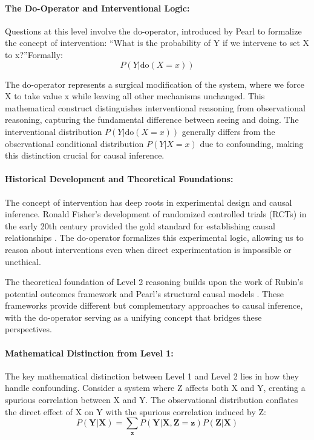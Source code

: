\paragraph{The Do-Operator and Interventional Logic:}

Questions at this level involve the do-operator, introduced by Pearl to formalize the concept of intervention: \textquotedblleft What is the probability of Y if we intervene to set X to x?\textquotedblright Formally:
\begin{equation}
	P(Y|\text{do}(X=x))
\end{equation}

The do-operator represents a surgical modification of the system, where we force X to take value x while leaving all other mechanisms unchanged. This mathematical construct distinguishes interventional reasoning from observational reasoning, capturing the fundamental difference between seeing and doing. The interventional distribution $P(Y|\text{do}(X=x))$ generally differs from the observational conditional distribution $P(Y|X=x)$ due to confounding, making this distinction crucial for causal inference.

\paragraph{Historical Development and Theoretical Foundations:}

The concept of intervention has deep roots in experimental design and causal inference. Ronald Fisher's development of randomized controlled trials (RCTs) in the early 20th century provided the gold standard for establishing causal relationships \cite{Fisher1970}. The do-operator formalizes this experimental logic, allowing us to reason about interventions even when direct experimentation is impossible or unethical.

The theoretical foundation of Level 2 reasoning builds upon the work of Rubin's potential outcomes framework \cite{Rubin1974} and Pearl's structural causal models \cite{Pearl2009}. These frameworks provide different but complementary approaches to causal inference, with the do-operator serving as a unifying concept that bridges these perspectives.

\paragraph{Mathematical Distinction from Level 1:}

The key mathematical distinction between Level 1 and Level 2 lies in how they handle confounding. Consider a system where Z affects both X and Y, creating a spurious correlation between X and Y. The observational distribution conflates the direct effect of X on Y with the spurious correlation induced by Z:
\begin{equation}
	P(\mathbf{Y}|\mathbf{X}) = \sum_{\mathbf{z}} P(\mathbf{Y}|\mathbf{X},\mathbf{Z}=\mathbf{z})P(\mathbf{Z}|\mathbf{X})
\end{equation}

